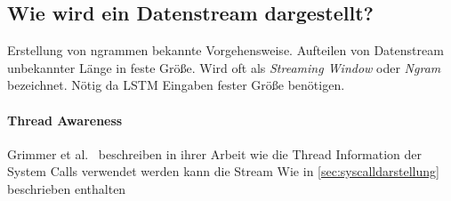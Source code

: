 %
        \subsection{Wie wird ein Datenstream dargestellt?}\label{sec:streamdarstellung}
            Erstellung von ngrammen bekannte Vorgehensweise.
            Aufteilen von Datenstream unbekannter Länge in feste Größe.
            Wird oft als \textit{Streaming Window} oder \textit{Ngram} bezeichnet.
            Nötig da \ac{LSTM} Eingaben fester Größe benötigen.

            \paragraph{Thread Awareness}
                Grimmer et al.~\cite{IDSTHREADGRIMMER2021} beschreiben in ihrer Arbeit wie die Thread Information der System Calls verwendet werden kann die Stream 
                Wie in \autoref{sec:syscalldarstellung} beschrieben enthalten  




